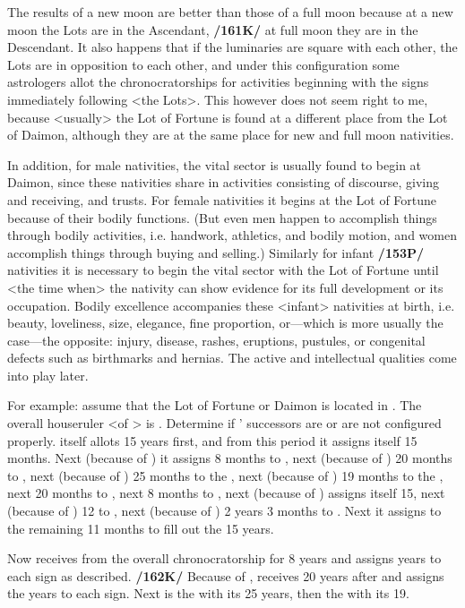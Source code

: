 The results of a new moon are better than those of a full
moon because at a new moon the Lots are in the Ascendant, \textbf{/161K/} at full moon they are in the Descendant. It also happens that if the luminaries are square with each other, the Lots are in opposition to each other, and under this configuration some astrologers allot the chronocratorships for activities beginning with the signs immediately following <the Lots>. This however does not seem right to me, because
<usually> the Lot of Fortune is found at a different place from the Lot of Daimon, although they are at the same place for new and full moon nativities.

In addition, for male nativities, the vital sector is usually found to begin at Daimon, since these nativities share in activities consisting of discourse, giving and receiving, and trusts. For female nativities it begins at the Lot of Fortune because of their bodily functions. (But even men happen to accomplish things through bodily activities, i.e. handwork, athletics, and bodily motion, and women accomplish
things through buying and selling.) Similarly for infant \textbf{/153P/} nativities it is necessary to begin the vital
sector with the Lot of Fortune until <the time when> the nativity can show evidence for its full development or its occupation. Bodily excellence accompanies these <infant> nativities at birth, i.e. beauty, loveliness, size, elegance, fine proportion, or—which is more usually the case—the opposite: injury, disease, rashes, eruptions, pustules, or congenital defects such as birthmarks and hernias. The
active and intellectual qualities come into play later.

For example: assume that the Lot of Fortune or Daimon is located in \Aries. The overall houseruler <of \Aries> is \Mars. Determine if \Mars’ successors are or are not configured properly. \Mars\xspace itself allots 15 years first, and from this period it assigns itself 15 months. Next (because of \Taurus) it assigns 8 months to \Venus, next (because of \Gemini) 20 months to \Mercury, next (because of \Cancer) 25 months to the \Moon, next (because of \Leo) 19 months to the \Sun, next 20 months to \Mercury, next 8 months to \Venus,
next (because of \Scorpio) \Mars assigns itself 15, next (because of \Sagittarius) 12 to \Jupiter, next (because of
\Capricorn) 2 years 3 months to \Saturn. Next it assigns to \Aquarius the remaining 11 months to fill out the 15 years. 

Now \Venus\xspace receives from \Mars\xspace the overall chronocratorship for 8 years and assigns years to
each sign as described. \textbf{/162K/} Because of \Gemini, \Mercury\xspace receives 20 years after \Venus\xspace and assigns the years to each sign. Next is the \Moon\xspace with its 25 years, then the \Sun\xspace with its 19. 


